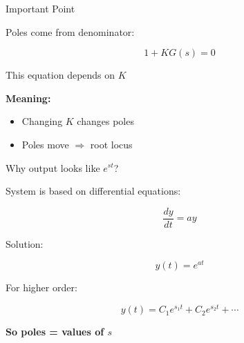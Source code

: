\documentclass{beamer}
\begin{document}

\begin{frame}{Important Point}

Poles come from denominator:

\begin{equation}
1 + KG(s) = 0
\end{equation}

This equation depends on $K$

\vspace{0.3cm}

\textbf{Meaning:}

\begin{itemize}
    \item Changing $K$ changes poles
    \item Poles move $\Rightarrow$ root locus
\end{itemize}

\end{frame}


\begin{frame}{Why output looks like $e^{st}$?}

System is based on differential equations:

\begin{equation}
\frac{dy}{dt} = ay
\end{equation}

Solution:

\begin{equation}
y(t) = e^{at}
\end{equation}

For higher order:

\begin{equation}
y(t) = C_1 e^{s_1 t} + C_2 e^{s_2 t} + \cdots
\end{equation}

\textbf{So poles = values of $s$}

\end{frame}

\end{document}
